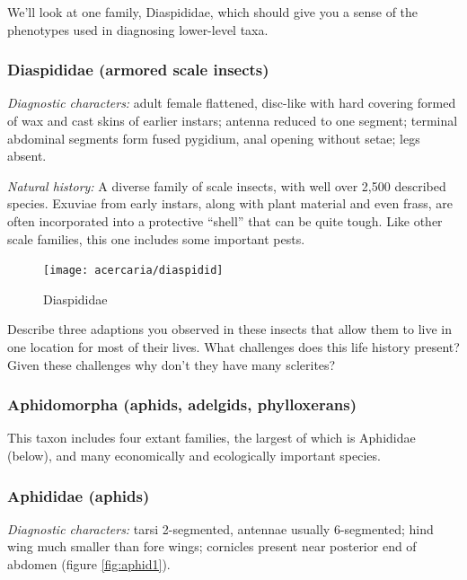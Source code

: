 \noindent{}We'll look at one family, Diaspididae, which should give you a sense of the phenotypes used in diagnosing lower-level taxa.\vspace{3mm}

\subsubsection{Diaspididae (armored scale insects)}
\noindent{}\textit{Diagnostic characters:} adult female flattened, disc-like with hard covering formed of wax and cast skins of earlier instars; antenna reduced to one segment; terminal abdominal segments form fused pygidium, anal opening without setae; legs absent.\vspace{3mm}

\noindent{}\textit{Natural history:} A diverse family of scale insects, with well over 2,500 described species. Exuviae from early instars, along with plant material and even frass, are often incorporated into a protective ``shell'' that can be quite tough. Like other scale families, this one includes some important pests.\vspace{3mm}

\begin{figure}[ht!]
 \centering
 \texttt{[image: acercaria/diaspidid]}
 \caption{Diaspididae \citep[][Figs. 2,4]{bhlitem108079scale}}
 \label{fig:diaspidid}
\end{figure}

\begin{theo}
{}Describe three adaptions you observed in these insects that allow them to live in one location for most of their lives. What challenges does this life history present? Given these challenges why don't they have many sclerites?
\end{theo} 

\subsubsection*{Aphidomorpha (aphids, adelgids, phylloxerans)}
This taxon includes four extant families, the largest of which is Aphididae (below), and many economically and ecologically important species. 

\subsubsection{Aphididae (aphids)}
\noindent{}\textit{Diagnostic characters:} tarsi 2-segmented, antennae usually 6-segmented; hind wing much smaller than fore wings; cornicles present near posterior end of abdomen (figure \ref{fig:aphid1}).\vspace{3mm}

